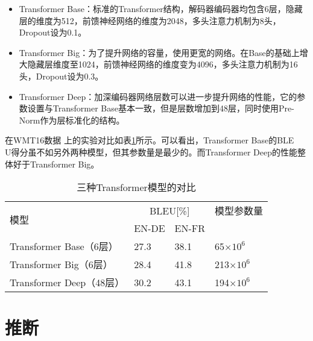 \begin{itemize}
\vspace{0.5em}
\item  Transformer Base：标准的Transformer结构，解码器编码器均包含6层，隐藏层的维度为512，前馈神经网络的维度为2048，多头注意力机制为8头，Dropout设为0.1。
\vspace{0.5em}
\item  Transformer Big：为了提升网络的容量，使用更宽的网络。在Base的基础上增大隐藏层维度至1024，前馈神经网络的维度变为4096，多头注意力机制为16头，Dropout设为0.3。
\vspace{0.5em}
\item Transformer Deep：加深编码器网络层数可以进一步提升网络的性能，它的参数设置与Transformer Base基本一致，但是层数增加到48层，同时使用Pre-Norm作为层标准化的结构。
\vspace{0.5em}
\end{itemize}

\parinterval 在WMT16数据 上的实验对比如表\ref{tab:12-3}所示。可以看出，Transformer Base的BLE\\U得分虽不如另外两种模型，但其参数量是最少的。而Transformer Deep的性能整体好于Transformer Big。

\begin{table}[htp]
\centering
\caption{三种Transformer模型的对比}
\label{tab:12-3}
\begin{tabular}{l | l l l}
\multirow{2}{*}{模型}   & \multicolumn{2}{c}{BLEU[\%]} & 模型参数量 \\
                      & EN-DE  & EN-FR  &                                  \\ \hline
Transformer Base（6层）     & 27.3            & 38.1            & 65$\times 10^{6}$                \\
Transformer Big（6层）      & 28.4            & 41.8            & 213$\times 10^{6}$               \\
Transformer Deep（48层） & 30.2            & 43.1            & 194$\times 10^{6}$              \\
\end{tabular}
\end{table}


\section{推断}

